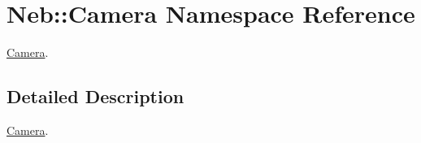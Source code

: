 \hypertarget{namespaceNeb_1_1Camera}{\section{Neb\-:\-:Camera Namespace Reference}
\label{namespaceNeb_1_1Camera}
}


\hyperlink{namespaceNeb_1_1Camera}{Camera}.  




\subsection{Detailed Description}
\hyperlink{namespaceNeb_1_1Camera}{Camera}. 